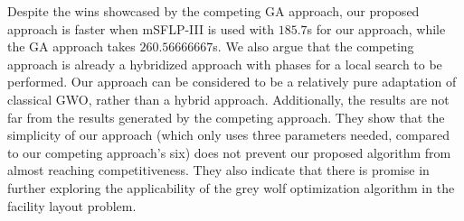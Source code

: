 Despite the wins showcased by the competing GA approach, our proposed approach is faster when mSFLP-III is used with $185.7$s for our approach, while the GA approach takes $260.56666667$s. We also argue that the competing approach is already a hybridized approach with phases for a local search to be performed. Our approach can be considered to be a relatively pure adaptation of classical GWO, rather than a hybrid approach. Additionally, the results are not far from the results generated by the competing approach. They show that the simplicity of our approach (which only uses three parameters needed, compared to our competing approach's six) does not prevent our proposed algorithm from almost reaching competitiveness. They also indicate that there is promise in further exploring the applicability of the grey wolf optimization algorithm in the facility layout problem.

